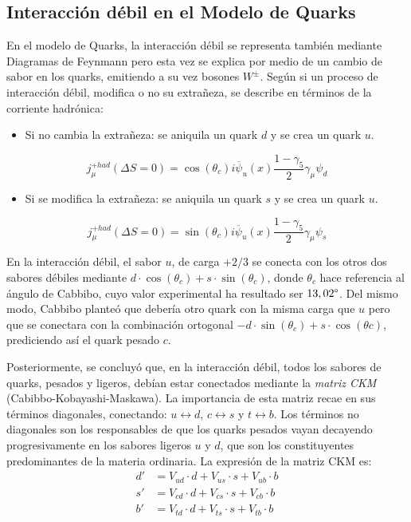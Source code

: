 \subsection{Interacción débil en el Modelo de Quarks}\label{sec:weak_int_quarks}
En el modelo de Quarks, la interacción débil se representa también mediante Diagramas de Feynmann pero esta vez se explica por medio de un cambio de sabor en los quarks, emitiendo a su vez bosones $W^{\pm}$. Según si un proceso de interacción débil, modifica o no su extrañeza, se describe en términos de la corriente hadrónica:
\begin{itemize}
\item Si no cambia la extrañeza: se aniquila un quark $d$ y se crea un quark $u$.
\end{itemize}
\begin{equation*}
j_{\mu}^{+had}(\Delta S= 0)=\cos \left( \theta _{c}\right) i\overline{\psi }_{u}\left( x\right) \dfrac{1-\gamma _{5}}{2}\gamma _{\mu }\psi _{d}
\end{equation*}
\begin{itemize}
\item Si se modifica la extrañeza: se aniquila un quark $s$ y se crea un quark $u$.
\end{itemize}
\begin{equation*}
j_{\mu}^{+had}(\Delta S= 0)=\sin \left( \theta _{c}\right) i\overline{\psi }_{u}\left( x\right) \dfrac{1-\gamma _{5}}{2}\gamma _{\mu }\psi _{s}
\end{equation*}

En la interacción débil, el sabor $u$, de carga $+2/3$ se conecta con los otros dos sabores débiles mediante $d\cdot \cos \left( \theta _{c}\right) +s\cdot \sin \left( \theta _{c}\right)$, donde $\theta _{c}$ hace referencia al ángulo de Cabbibo, cuyo valor experimental ha resultado ser $13,02\degree$. Del mismo modo, Cabbibo planteó que debería otro quark con la misma carga que $u$ pero que se conectara con la combinación ortogonal $-d\cdot \sin \left( \theta _{c}\right) +s\cdot \cos \left( \theta c\right)$, prediciendo así el quark pesado $c$.

Posteriormente, se concluyó que, en la interacción débil, todos los sabores de quarks, pesados y ligeros, debían estar conectados mediante la  \textit{matriz CKM} (Cabibbo-Kobayashi-Maskawa). La importancia de esta matriz recae en sus términos diagonales, conectando: $u\leftrightarrow d$, $c\leftrightarrow s$ y $t\leftrightarrow b$. Los términos no diagonales son los responsables de que los quarks pesados vayan decayendo progresivamente en los sabores ligeros $u$ y $d$, que son los constituyentes predominantes de la materia ordinaria. La expresión de la matriz CKM es:
\begin{align}
d' &= V_{ud}\cdot d+V_{us}\cdot s + V_{ub}\cdot b \nonumber \\
s' &= V_{cd}\cdot d+V_{cs}\cdot s + V_{cb}\cdot b \\
b' &= V_{td}\cdot d+V_{ts}\cdot s + V_{tb}\cdot b \nonumber\label{eq:CKM_matrix}
\end{align}


